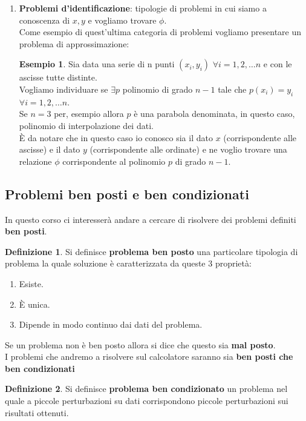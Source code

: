 \documentclass[12pt, a4paper]{book}
\theoremstyle{definition}
\newtheorem{exmp}{Esempio}[section]
\newtheorem{defn}{Definizione}[section]
\begin{document}
\begin{flushleft}
\begin{enumerate}
\item \textbf{Problemi d'identificazione}: tipologie di problemi in cui siamo a conoscenza di $x, y$ e vogliamo trovare $\phi$.\\
Come esempio di quest'ultima categoria di problemi vogliamo presentare un problema di approssimazione:
\begin{exmp}
Sia data una serie di n punti $(x_{i}, y_{i})$ $\forall i = 1,2, \dots  n$ e con le ascisse tutte distinte. \\
Vogliamo individuare se $\exists p $ polinomio di grado $n-1$ tale che $p(x_{i}) = y_{i}$ $\forall i = 1,2, \dots  n$.\\
Se $n = 3$ per,  esempio allora $p$ è una parabola denominata,  in questo caso,  polinomio di interpolazione dei dati. \\
È da notare che in questo caso io conosco sia il dato $x$ (corrispondente alle ascisse) e il dato $y$ (corrispondente alle ordinate) e ne voglio trovare una relazione $\phi$ corrispondente al polinomio $p$ di grado $n-1$.
\end{exmp}
\end{enumerate}
\end{flushleft}

\subsection{Problemi ben posti e ben condizionati}
\begin{flushleft}

In questo corso ci interesserà andare a cercare di risolvere dei problemi definiti \textbf{ben posti}.

\begin{defn}
Si definisce \textbf{problema ben posto} una particolare tipologia di problema la quale soluzione è caratterizzata da queste 3 proprietà: 
\begin{enumerate}
\item Esiste.
\item È unica.
\item Dipende in modo continuo dai dati del problema.
\end{enumerate}
\end{defn}
Se un problema non è ben posto allora si dice che questo sia \textbf{mal posto}.\\
I problemi che andremo a risolvere sul calcolatore saranno sia \textbf{ben posti che ben condizionati}
\begin{defn}
Si definisce \textbf{problema ben condizionato} un problema nel quale a piccole perturbazioni su dati corrispondono piccole perturbazioni sui risultati ottenuti.
\end{defn}
\end{flushleft}
\end{document}
